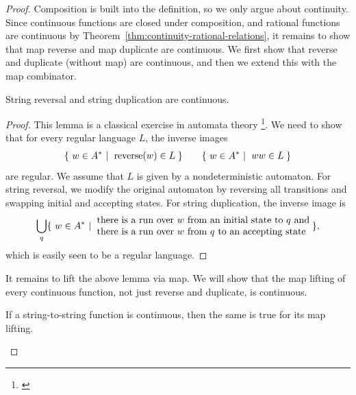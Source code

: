 \begin{proof}
    Composition is built into the definition, so we only argue about continuity. Since continuous functions are closed under composition, and rational functions are continuous by Theorem~\ref{thm:continuity-rational-relations}, it remains to show that map reverse and map duplicate are continuous. We first show that reverse and duplicate (without map) are continuous, and then we extend this with the map combinator. 
\begin{lemma}\label{lem:reversal-duplication-continuous}
    String reversal and string duplication are continuous.
\end{lemma}

\begin{proof} This lemma is a classical exercise in automata theory
    \footnote{\cite[Problems 30 and 35]{200problems}}. 
    We need to show that for every regular language $L$, the inverse images 
    \begin{align*}
    \setbuild{ w \in A^*}{reverse$(w) \in L$}
    \qquad 
    \setbuild{ w \in A^*}{$ww \in L$}
    \end{align*}
    are regular. We assume that $L$ is given by a nondeterministic automaton. For string reversal, we modify the original automaton  by reversing all transitions and swapping initial and accepting states. For string duplication, the inverse image is 
    \begin{align*}
    \bigcup_{q} \setbuild{ w \in A^*}{
        there is a run over $w$ from an initial state to $q$ and \\
        there is a run over $w$ from $q$ to an accepting state
    },
    \end{align*}
    which is easily seen to be a regular language.
\end{proof}


It remains to lift the above lemma via map. We will show that the map lifting of every continuous function, not just reverse and duplicate, is continuous.
    \begin{lemma}
    \label{lem:map-lifting-continuous}
    If a string-to-string function is continuous, then the same is true for  its map lifting.
    \end{lemma}


\end{proof}
